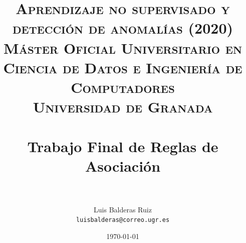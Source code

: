 
\graphicspath{ {./images/} }
\usepackage{subcaption}
\usepackage{hyperref}



\title{	
\normalfont \normalsize 
\textsc{\textbf{Aprendizaje no supervisado y detección de anomalías (2020)} \\ Máster Oficial Universitario en Ciencia de Datos e Ingeniería de Computadores \\ Universidad de Granada} \\ [25pt] %
\horrule{0.5pt} \\[0.4cm] %
\huge Trabajo Final de Reglas de Asociación \\ %
\horrule{2pt} \\[0.5cm] %
}

\author{Luis Balderas Ruiz \\ \texttt{luisbalderas@correo.ugr.es}} 


\date{\normalsize\today} %




\maketitle %

\newpage %

\tableofcontents %

\listoffigures

\listoftables

\newpage



